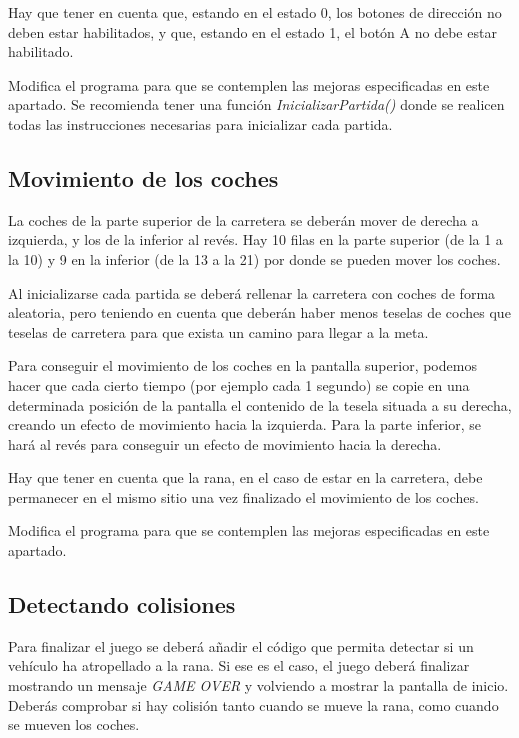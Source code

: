 Hay que tener en cuenta que, estando en el estado 0, los botones de dirección no deben estar habilitados, y que, estando en el estado 1, el botón A no debe estar habilitado.

\begin{exercise}
	Modifica el programa para que se contemplen las mejoras especificadas en este apartado. Se recomienda tener una función \textit{InicializarPartida()} donde se realicen todas las instrucciones necesarias para inicializar cada partida.	
\end{exercise}


\subsection{Movimiento de los coches}
La coches de la parte superior de la carretera se deberán mover de derecha a izquierda, y los de la inferior al revés. Hay 10 filas en la parte superior (de la 1 a la 10) y 9 en la inferior (de la 13 a la 21) por donde se pueden mover los coches. 

Al inicializarse cada partida se deberá rellenar la carretera con coches de forma aleatoria, pero teniendo en cuenta que deberán haber menos teselas de coches que teselas de carretera para que exista un camino para llegar a la meta.

Para conseguir el movimiento de los coches en la pantalla superior, podemos hacer que cada cierto tiempo (por ejemplo cada 1 segundo) se copie en una determinada posición de la pantalla el contenido de la tesela situada a su derecha, creando un efecto de movimiento hacia la izquierda. Para la parte inferior, se hará al revés para conseguir un efecto de movimiento hacia la derecha.

Hay que tener en cuenta que la rana, en el caso de estar en la carretera, debe permanecer en el mismo sitio una vez finalizado el movimiento de los coches.

\begin{exercise}
	Modifica el programa para que se contemplen las mejoras especificadas en este  apartado. 	
\end{exercise}

\subsection{Detectando colisiones}
Para finalizar el juego se deberá añadir el código que permita detectar si un vehículo ha atropellado a la rana. Si ese es el caso, el juego deberá finalizar mostrando un mensaje \textit{GAME OVER} y volviendo a mostrar la pantalla de inicio.
Deberás comprobar si hay colisión tanto cuando se mueve la rana, como cuando se mueven los coches.

